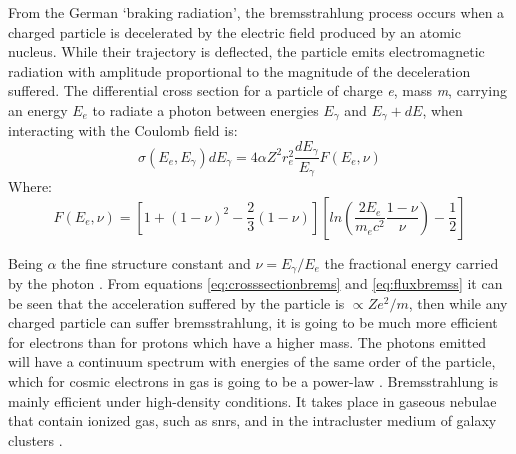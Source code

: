 \documentclass[main.tex]{subfiles}
\begin{document}
From the German `braking radiation', the bremsstrahlung process occurs when a charged particle is decelerated by the electric field produced by an atomic nucleus. While their trajectory is deflected, the particle emits electromagnetic radiation with amplitude proportional to the magnitude of the deceleration suffered. The differential cross section for a particle of charge \textit{e}, mass \textit{m}, carrying an energy $E_{e}$ to radiate a photon between energies $E_{\gamma}$ and $E_{\gamma}+dE$, when interacting with the Coulomb field is:
\begin{equation} \label{eq:crosssectionbrems}
    \sigma(E_{e},E_{\gamma})dE_{\gamma} = 4\alpha Z^2r^{2}_{e}\frac{dE_{\gamma}}{E_{\gamma}}F(E_{e}, \nu)
\end{equation}
Where:
\begin{equation} \label{eq:fluxbremss}
    F(E_{e},\nu) = [1+(1-\nu)^2-\frac{2}{3}(1-\nu)]\left[ ln \left( \frac{2E_{e}}{m_{e}c^2} \frac{1-\nu}{\nu}\right)-\frac{1}{2}\right]
\end{equation}

Being $\alpha$ the fine structure constant and $\nu = E_{\gamma}/E_e$ the fractional energy carried by the photon \cite{1993MurthyGammaRay}. From equations \ref{eq:crosssectionbrems} and \ref{eq:fluxbremss} it can be seen that the acceleration suffered by the particle is $\propto Ze^2/m$, then while any charged particle can suffer bremsstrahlung, it is going to be much more efficient for electrons than for protons which have a higher mass.
The photons emitted will have a continuum spectrum with energies of the same order of the particle, which for cosmic electrons in gas is going to be a power-law \cite{weekes2003HEAstrophy}. Bremsstrahlung is mainly efficient under high-density conditions. It takes place in gaseous nebulae that contain ionized gas, such as \glspl{snr}, and in the intracluster medium of galaxy clusters \cite{MaozNushellAstro}. 
\end{document}
